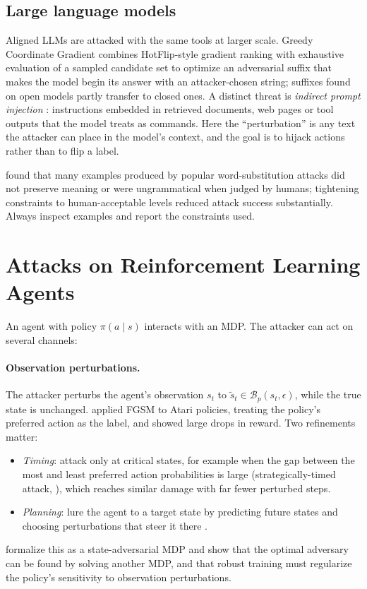 \documentclass[10pt,a4paper]{extarticle}
\theoremstyle{definition}
\newcommand{\B}{\mathcal{B}}
\begin{document}
\subsection{Large language models}

Aligned LLMs are attacked with the same tools at larger scale. Greedy Coordinate Gradient \citep{zou2023universal} combines HotFlip-style gradient ranking with exhaustive evaluation of a sampled candidate set to optimize an adversarial suffix that makes the model begin its answer with an attacker-chosen string; suffixes found on open models partly transfer to closed ones. A distinct threat is \emph{indirect prompt injection} \citep{greshake2023indirect}: instructions embedded in retrieved documents, web pages or tool outputs that the model treats as commands. Here the \enquote{perturbation} is any text the attacker can place in the model's context, and the goal is to hijack actions rather than to flip a label.

\begin{warnbox}
\citet{morris2020reevaluating} found that many examples produced by popular word-substitution attacks did not preserve meaning or were ungrammatical when judged by humans; tightening constraints to human-acceptable levels reduced attack success substantially. Always inspect examples and report the constraints used.
\end{warnbox}

\section{Attacks on Reinforcement Learning Agents}

An agent with policy \(\pi(a\mid s)\) interacts with an MDP. The attacker can act on several channels:

\paragraph{Observation perturbations.} The attacker perturbs the agent's observation \(s_t\) to \(\tilde s_t\in\B_p(s_t,\epsilon)\), while the true state is unchanged. \citet{huang2017adversarial} applied FGSM to Atari policies, treating the policy's preferred action as the label, and showed large drops in reward. Two refinements matter:
\begin{itemize}
  \item \emph{Timing}: attack only at critical states, for example when the gap between the most and least preferred action probabilities is large (strategically-timed attack, \citealp{lin2017tactics}), which reaches similar damage with far fewer perturbed steps.
  \item \emph{Planning}: lure the agent to a target state by predicting future states and choosing perturbations that steer it there \citep{lin2017tactics}.
\end{itemize}
\citet{zhang2020sadqn} formalize this as a state-adversarial MDP and show that the optimal adversary can be found by solving another MDP, and that robust training must regularize the policy's sensitivity to observation perturbations.
\end{document}
